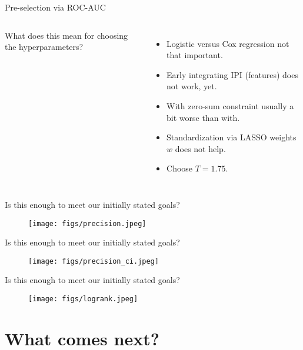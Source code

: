\documentclass[10pt, aspectratio=169]{beamer}
\begin{document}
\begin{frame}{Pre-selection via ROC-AUC}
  \begin{columns}
    {
      \small
      
    }
      What does this mean for choosing the hyperparameters?
      \begin{itemize}
        \item Logistic versus Cox regression not that important.
        \item Early integrating IPI (features) does not work, yet.
        \item With zero-sum constraint usually a bit worse than with.
        \item Standardization via LASSO weights $w$ does not help.
        \item Choose $T = 1.75$.
      \end{itemize}
  \end{columns}
\end{frame}

\begin{frame}{Is this enough to meet our initially stated goals?}
  \begin{figure}[h]
    \centering
    \texttt{[image: figs/precision.jpeg]}
  \end{figure}
\end{frame}

\begin{frame}{Is this enough to meet our initially stated goals?}
  \begin{figure}[h]
    \centering
    \texttt{[image: figs/precision\_ci.jpeg]}
  \end{figure}
\end{frame}

\begin{frame}{Is this enough to meet our initially stated goals?}
  \begin{figure}[h]
    \centering
    \texttt{[image: figs/logrank.jpeg]}
  \end{figure}
\end{frame}

\section{What comes next?}
\end{document}
